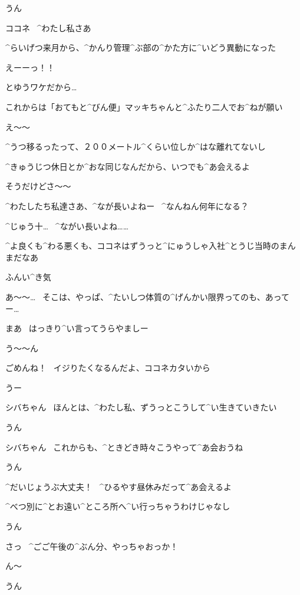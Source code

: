 \Kokone うん

\page
\Shiba ココネ
\ ^{わたし}{私}さあ

\Shiba ^{らいげつ}{来月}から、^{かんり}{管理}^{ぶ}{部}の^{かた}{方}に^{いどう}{異動}になった

\Kokone えーーっ！！

\Shiba とゆうワケだから…

\Shiba これからは「おてもと^{びん}{便}」マッキちゃんと^{ふたり}{二人}でお^{ねが}{願}い

\Kokone え〜〜

\Shiba ^{うつ}{移}るったって、２００メートル^{くらい}{位}しか^{はな}{離}れてないし

\Shiba ^{きゅうじつ}{休日}とか^{おな}{同}じなんだから、いつでも^{あ}{会}えるよ

\Kokone そうだけどさ〜〜

\page
\Shiba ^{わたしたち}{私達}さあ、^{なが}{長}いよねー
\ ^{なんねん}{何年}になる？

\Kokone ^{じゅう}{十}…
\ ^{ながい}{長い}よね……

\page
\Shiba ^{よ}{良}くも^{わる}{悪}くも、ココネはずうっと^{にゅうしゃ}{入社}^{とうじ}{当時}のまんまだなあ

\Shiba ふんい^{き}{気}

\Kokone あ〜〜…
\ そこは、やっぱ、^{たいしつ}{体質}の^{げんかい}{限界}ってのも、あってー…

\Shiba まあ
\ はっきり^{い}{言}ってうらやましー

\Kokone う〜〜ん

\page
\Shiba ごめんね！
\ イジりたくなるんだよ、ココネカタいから

\Kokone うー

\page
\Kokone シバちゃん
\ ほんとは、^{わたし}{私}、ずうっとこうして^{い}{生}きていきたい

\Shiba うん

\page
\Kokone シバちゃん
\ これからも、^{ときどき}{時々}こうやって^{あ}{会}おうね

\Shiba うん

\Shiba ^{だいじょうぶ}{大丈夫}！
\ ^{ひるやす}{昼休}みだって^{あ}{会}えるよ

\Shiba ^{べつ}{別}に^{とお}{遠}い^{ところ}{所}へ^{い}{行}っちゃうわけじゃなし

\Kokone うん

\page[86]
\Shiba さっ
\ ^{ごご}{午後}の^{ぶん}{分}、やっちゃおっか！

\Shiba ん〜

\Kokone うん

